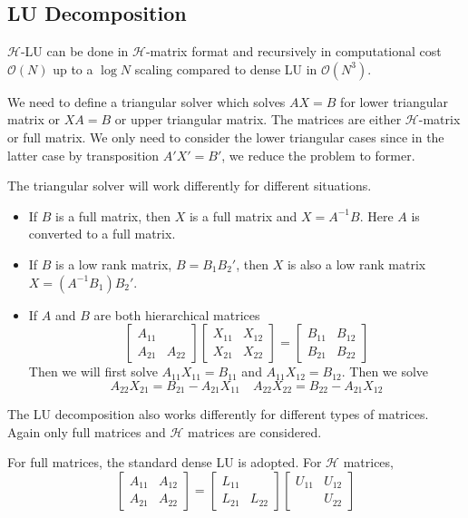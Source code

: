 \documentclass[10pt,a4paper]{article}
\theoremstyle{definition}
\begin{document}
\subsection{LU Decomposition}

$\mathcal{H}$-LU can be done in $\mathcal{H}$-matrix format and recursively in computational cost $\mathcal{O}(N)$ up to a $\log N$ scaling compared to dense LU in $\mathcal{O}(N^3)$.


We need to define a triangular solver which solves $AX=B$ for lower triangular matrix or $XA = B$ or upper triangular matrix. The matrices are either $\mathcal{H}$-matrix or full matrix. We only need to consider the lower triangular cases since in the latter case by transposition $A'X'=B'$, we reduce the problem to former. 

The triangular solver will work differently for different situations.
\begin{itemize}
	\item If $B$ is a full matrix, then $X$ is a full matrix and $X=A^{-1}B$. Here $A$ is converted to a full matrix.
	\item If $B$ is a low rank matrix, $B=B_1B_2'$, then $X$ is also a low rank matrix $X = (A^{-1}B_1)B_2'$.
	\item If $A$ and $B$ are both hierarchical matrices
	\[\left[ {\begin{array}{*{20}{c}}
{{A_{11}}}&{}\\
{{A_{21}}}&{{A_{22}}}
\end{array}} \right]\left[ {\begin{array}{*{20}{c}}
{{X_{11}}}&{{X_{12}}}\\
{{X_{21}}}&{{X_{22}}}
\end{array}} \right] = \left[ {\begin{array}{*{20}{c}}
{{B_{11}}}&{{B_{12}}}\\
{{B_{21}}}&{{B_{22}}}
\end{array}} \right]\]
Then we will first solve $A_{11}X_{11}=B_{11}$ and $A_{11}X_{12}=B_{12}$. Then we solve
\begin{equation}
	A_{22}X_{21} = B_{21}-A_{21}X_{11}\quad A_{22}X_{22} = B_{22}-A_{21}X_{12}
\end{equation}	
\end{itemize}

The LU decomposition also works differently for different types of matrices. Again only full matrices and $\mathcal{H}$ matrices are considered. 

For full matrices, the standard dense LU is adopted. For $\mathcal{H}$ matrices, 
\[\left[ {\begin{array}{*{20}{c}}
{{A_{11}}}&{{A_{12}}}\\
{{A_{21}}}&{{A_{22}}}
\end{array}} \right] = \left[ {\begin{array}{*{20}{c}}
{{L_{11}}}&\\
{{L_{21}}}&{{L_{22}}}
\end{array}} \right]\left[ {\begin{array}{*{20}{c}}
{{U_{11}}}&{{U_{12}}}\\
{}&{{U_{22}}}
\end{array}} \right]\]
\end{document}
